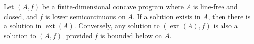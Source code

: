 Let $(A, f)$ be a finite-dimensional concave program where $A$ is line-free and closed, and $f$ is lower semicontinuous on $A$. If a solution exists in $A$, then there is a solution in $\operatorname{ext}(A)$. Conversely, any solution to $(\operatorname{ext}(A), f)$ is also a solution to $(A, f)$, provided $f$ is bounded below on $A$.